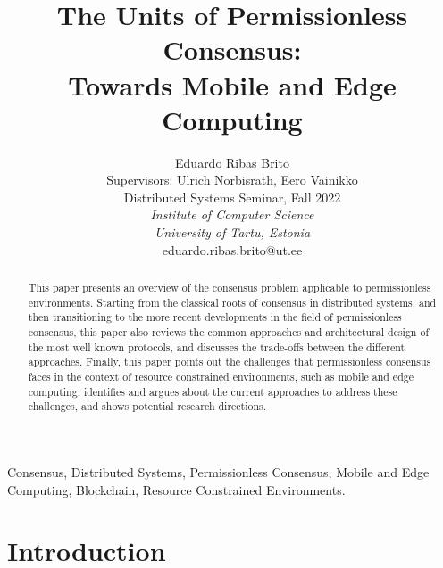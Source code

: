 \documentclass[journal]{IEEEtran}
\begin{document}
\title{The Units of Permissionless Consensus: \\ Towards Mobile and Edge Computing}

\author{Eduardo Ribas Brito 
\\Supervisors: Ulrich Norbisrath, Eero Vainikko
\\Distributed Systems Seminar, Fall 2022
\\\emph{Institute of Computer Science}
\\\emph{University of Tartu, Estonia}
\\ eduardo.ribas.brito@ut.ee}

\maketitle

\begin{abstract}

This paper presents an overview of the consensus problem
applicable to permissionless environments. Starting from 
the classical roots of consensus in distributed systems,
and then transitioning to the more recent developments in the
field of permissionless consensus, this paper also reviews
the common approaches and architectural design of the most well known protocols, 
and discusses the trade-offs between the different approaches.
Finally, this paper points out the challenges that
permissionless consensus faces in the context of resource
constrained environments, such as mobile and edge computing,
identifies and argues about the current approaches to address these challenges,
and shows potential research directions.

\end{abstract}

\begin{IEEEkeywords}
Consensus, Distributed Systems, Permissionless Consensus, Mobile and Edge Computing, Blockchain, Resource Constrained Environments.
\end{IEEEkeywords}

\section{Introduction}
\end{document}
